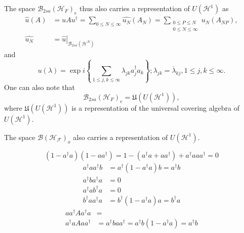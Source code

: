 \documentclass[aps,preprint]{revtex4}%
\begin{document}
The space $\mathcal{B}_{2sa}\left(  \mathcal{H}_{F}\right)  _{e}$ thus also
carries a representation of $U\left(  \mathcal{H}^{1}\right)  $ as
\begin{align}
\widehat{u}(A)  &  =uAu^{\dagger}=\sum_{0\leq N\leq\infty}\widehat{u_{N}%
}\left(  A_{N}\right)  =\sum_{\substack{0\leq P\leq N\\0\leq N\leq\infty
}}\widehat{u_{N}}\left(  A_{NP}\right)  ,\\
\widehat{u_{N}}  &  =\left.  \widehat{u}\right\vert _{\mathcal{B}_{2sa}\left(
\mathcal{H}^{N}\right)  }%
\end{align}
and
\begin{equation}
u\left(  \lambda\right)  =\exp i\left\{  \sum_{1\leq j,k\leq\infty}%
\lambda_{jk}a_{j}^{\dagger}a_{k}\right\}  ;\lambda_{jk}=\overline{\lambda
}_{kj},1\leq j,k\leq\infty.
\end{equation}
One can also note that
\begin{equation}
\mathcal{B}_{2sa}\left(  \mathcal{H}_{F}\right)  _{e}=\mathfrak{U}\left(
U\left(  \mathcal{H}^{1}\right)  \right)  ,
\end{equation}
where $\mathfrak{U}\left(  U\left(  \mathcal{H}^{1}\right)  \right)  $ is a
representation of the universal covering algebra of $U\left(  \mathcal{H}%
^{1}\right)  .$

The space $\mathcal{B}\left(  \mathcal{H}_{\mathcal{F}}\right)  _{o}$ also
carries a representation of $U\left(  \mathcal{H}^{1}\right)  .$%

\begin{equation}
\left(  1-a^{\dagger}a\right)  \left(  1-aa^{\dagger}\right)  =1-\left(
a^{\dagger}a+aa^{\dagger}\right)  +a^{\dagger}aaa^{\dagger}=0
\end{equation}%
\begin{align}
a^{\dagger}aa^{\dagger}b  &  =a^{\dagger}\left(  1-a^{\dagger}a\right)
b=a^{\dagger}b\nonumber\\
a^{\dagger}ba^{\dagger}a  &  =0\nonumber\\
a^{\dagger}ab^{\dagger}a  &  =0\nonumber\\
b^{\dagger}aa^{\dagger}a  &  =b^{\dagger}\left(  1-a^{\dagger}a\right)
a=b^{\dagger}a
\end{align}%
\begin{align}
aa^{\dagger}Aa^{\dagger}a  &  =\nonumber\\
a^{\dagger}aAaa^{\dagger}  &  =a^{\dagger}baa^{\dagger}=a^{\dagger}b\left(
1-a^{\dagger}a\right)  =a^{\dagger}b
\end{align}
\end{document}
